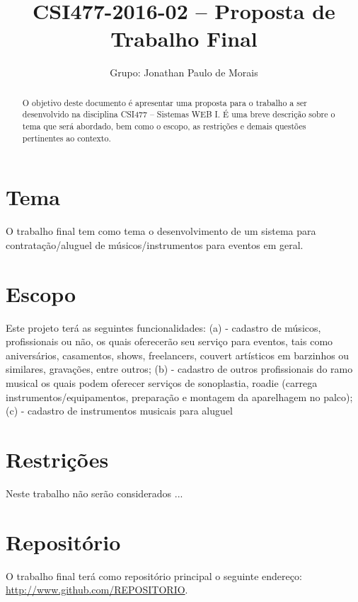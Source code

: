 \documentclass[10pt,a4paper,article]{abntex2}
\author{Grupo: Jonathan Paulo de Morais}
\title{CSI477-2016-02 -- Proposta de Trabalho Final}
\begin{document}
	\maketitle

	\begin{abstract}
		O objetivo deste documento é apresentar uma proposta para o trabalho a ser desenvolvido na disciplina CSI477 -- Sistemas WEB I. É uma breve descrição sobre o tema que será abordado, bem como o escopo, as restrições e demais questões pertinentes ao contexto.
	\end{abstract}		
	
	\section{Tema}
	
		O trabalho final tem como tema o desenvolvimento de um sistema para contratação/aluguel de músicos/instrumentos para eventos em geral.
	
	\section{Escopo}
	
		Este projeto terá as seguintes funcionalidades: (a) - cadastro de músicos, profissionais ou não, os quais oferecerão seu serviço para eventos, tais como aniversários, casamentos, shows, freelancers, couvert artísticos em barzinhos ou similares, gravações, entre outros; (b) - cadastro de outros profissionais do ramo musical os quais podem oferecer serviços de sonoplastia, roadie (carrega instrumentos/equipamentos, preparação e montagem da aparelhagem no palco); (c) - cadastro de instrumentos musicais para aluguel

	\section{Restrições}

		Neste trabalho não serão considerados ...

	\section{Repositório}

		O trabalho final terá como repositório principal o seguinte endereço: \url{http://www.github.com/REPOSITORIO}.

\end{document}
